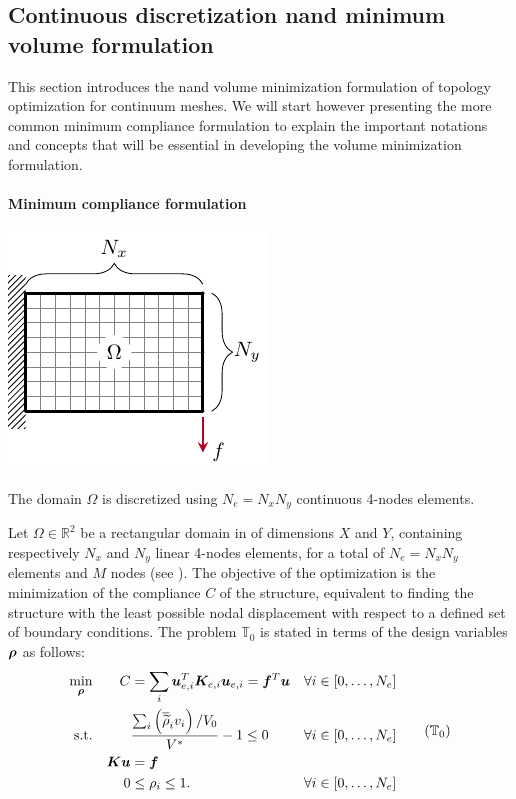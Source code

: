 \subsection{Continuous discretization \gls{nand} minimum volume formulation}
This section introduces the \gls{nand} volume minimization formulation of topology optimization for continuum meshes. We will start however presenting the more common minimum compliance formulation to explain the important notations and concepts that will be essential in developing the volume minimization formulation.

\paragraph{Minimum compliance formulation}
\begin{marginfigure}
    \centering
    \includegraphics{figures/03_comparison_TO_TTO/00_contin_mesh/c_mesh.pdf}
    \caption{The domain $\Omega$ is discretized using $N_e=N_x N_y$ continuous 4-nodes elements.}
    \label{fig:03_mesh_c}
\end{marginfigure}
Let $\Omega \in \mathbb{R}^2$ be a rectangular domain in of dimensions $X$ and $Y$, containing respectively $N_x$ and $N_y$ linear 4-nodes elements, for a total of $N_e=N_x N_y$ elements and $M$ nodes (see ). The objective of the optimization is the minimization of the compliance $C$ of the structure, equivalent to finding the structure with the least possible nodal displacement with respect to a defined set of boundary conditions. The problem $\mathbb{T}_0$ is stated in terms of the design variables $\bm{\rho}$ as follows:
\begin{equation}
    \begin{aligned}
    \min_{\vect{\rho}}         && C &= \sum_{i} \vect{u}_{e,i}^T \matr{K}_{e,i} \vect{u}_{e,i}=\vect{f}^T\vect{u}&& \forall i \in [0,\dots,N_e]                         \\
    \textrm{s.t.}   && & \frac{\sum_{i} \left(\rhophys_i v_i \right) / V_0}{V^*} - 1 \leq 0 && \forall i \in [0,\dots,N_e] \\
    && \matr{K}\vect{u} &= \vect{f} &&\\
    && 0 &\leq \rho_i \leq 1. && \forall i \in [0,\dots,N_e] \\
    \end{aligned}
    \tag{$\mathbb{T}_0$}
    \label{eq:03_prob-comp}
\end{equation}
